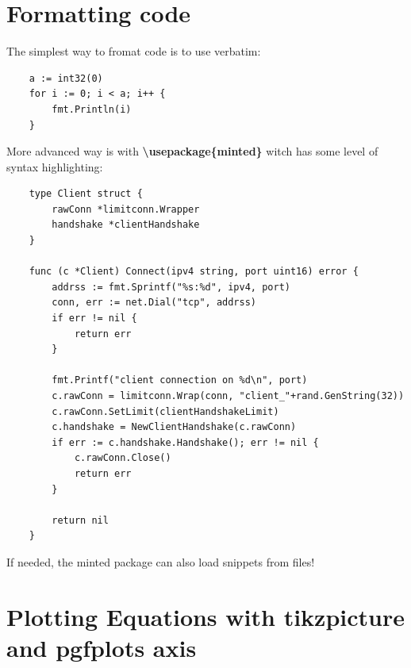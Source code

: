 \documentclass[12pt]{article}
\begin{document}
\section{Formatting code}

The simplest way to fromat code is to use verbatim:
\begin{verbatim}
    a := int32(0)
    for i := 0; i < a; i++ {
        fmt.Println(i)
    }
\end{verbatim}

\noindent More advanced way is with \textbf{\textbackslash usepackage\{minted\}} witch has some level of syntax highlighting:
\begin{verbatim}
    type Client struct {
        rawConn *limitconn.Wrapper
        handshake *clientHandshake
    }

    func (c *Client) Connect(ipv4 string, port uint16) error {
        addrss := fmt.Sprintf("%s:%d", ipv4, port)
        conn, err := net.Dial("tcp", addrss)
        if err != nil {
            return err
        }

        fmt.Printf("client connection on %d\n", port)
        c.rawConn = limitconn.Wrap(conn, "client_"+rand.GenString(32))
        c.rawConn.SetLimit(clientHandshakeLimit)
        c.handshake = NewClientHandshake(c.rawConn)
        if err := c.handshake.Handshake(); err != nil {
            c.rawConn.Close()
            return err
        }

        return nil
    }
\end{verbatim}

\noindent If needed, the minted package can also load snippets from files!

\section{Plotting Equations with tikzpicture and pgfplots axis}

\begin{center}
\end{center}

\newpage
\printbibliography
\end{document}
